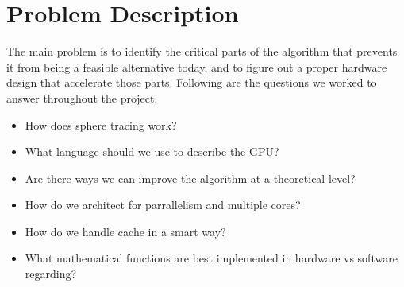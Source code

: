 \chapter{Problem Description}

The main problem is to identify the critical parts of the algorithm that
prevents it from being a feasible alternative today, and to figure out a proper
hardware design that accelerate those parts. Following are the questions we
worked to answer throughout the project.

\begin{itemize}
	\item	How does sphere tracing work?
	\item What language should we use to describe the GPU?
	\item Are there ways we can improve the algorithm at a theoretical level?
	\item How do we architect for parrallelism and multiple cores?
	\item How do we handle cache in a smart way?
	\item What mathematical functions are best implemented in hardware vs software regarding?

\end{itemize}
